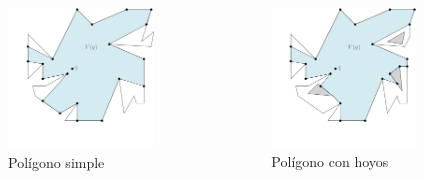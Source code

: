 \documentclass[aspectratio=169,xcolor=dvipsnames, t]{beamer}
\begin{document}
\begin{frame}
  \begin{columns}[t]
    \begin{column}{0.33\textwidth}
      \begin{figure}
        \centering
        \includegraphics[width=0.9\textwidth]{imagenes/Case2.1a.png}
        \caption{Polígono simple}
      \end{figure}
    \end{column}

    \begin{column}{0.33\textwidth}
      \begin{figure}
        \centering
        \includegraphics[width=0.9\textwidth]{imagenes/Case2.1b.png}
        \caption{Polígono con hoyos}
      \end{figure}
    \end{column}


\end{columns}
\end{frame}
\end{document}
